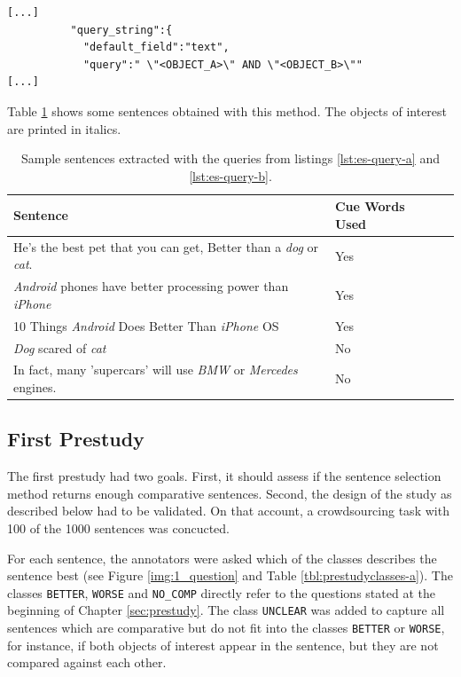 \begin{lstlisting}[label=lst:es-query-b,breaklines=true,postbreak=\mbox{\textcolor{red}{$\hookrightarrow$}\space},caption=The second query for the prestudy (shortened). This query does not search for the cue words.]
[...]
          "query_string":{
            "default_field":"text",
            "query":" \"<OBJECT_A>\" AND \"<OBJECT_B>\""
[...]
\end{lstlisting}

Table \ref{tbl:example_sentences} shows some sentences obtained with this method. The objects of interest are printed in italics.

\begin{table}[h]
\centering
\caption{Sample sentences extracted with the queries from listings \ref{lst:es-query-a} and \ref{lst:es-query-b}.}
\label{tbl:example_sentences}
\begin{tabular}{@{}llr@{}}
\toprule
 Sentence   &  Cue Words Used                      \\ \midrule
 He's the best pet that you can get, Better than a \emph{dog} or \emph{cat}. & Yes \\
\emph{Android} phones have better processing power than \emph{iPhone} & Yes \\
 10 Things \emph{Android} Does Better Than \emph{iPhone} OS & Yes \\
 \emph{Dog} scared of \emph{cat} & No \\
 In fact, many 'supercars' will use \emph{BMW} or \emph{Mercedes} engines. & No \\

\bottomrule  
                               
\end{tabular}
\end{table}



\subsection{First Prestudy}
The first prestudy had two goals. First, it should assess if the sentence selection method returns enough comparative sentences. Second, the design of the study as described below had to be validated. On that account, a crowdsourcing task with 100 of the 1000 sentences was concucted. 



For each sentence, the annotators were asked which of the classes describes the sentence best (see Figure \ref{img:1_question} and Table \ref{tbl:prestudyclasses-a}). The classes \texttt{BETTER}, \texttt{WORSE} and \texttt{NO\_COMP} directly refer to the questions stated at the beginning of Chapter \ref{sec:prestudy}. The class \texttt{UNCLEAR} was added to capture all sentences which are comparative but do not fit into the classes \texttt{BETTER} or \texttt{WORSE}, for instance, if both objects of interest appear in the sentence, but they are not compared against each other.

